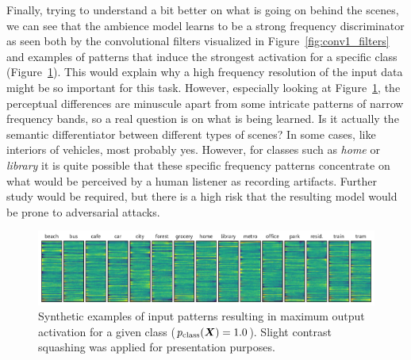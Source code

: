 \documentclass{article}
\newcommand{\symmat}[1]{{\mbox{\boldmath $#1$}}}
\begin{document}
\begin{sloppy}
Finally, trying to understand a bit better on what is going on behind the scenes, we can see that the ambience model learns to be a strong frequency discriminator as seen both by the convolutional filters visualized in Figure~\ref{fig:conv1_filters} and examples of patterns that induce the strongest activation for a specific class (Figure~\ref{fig:max_activations}). This would explain why a high frequency resolution of the input data might be so important for this task. However, especially looking at Figure~\ref{fig:max_activations}, the perceptual differences are minuscule apart from some intricate patterns of narrow frequency bands, so a real question is on what is being learned. Is it actually the semantic differentiator between different types of scenes? In some cases, like interiors of vehicles, most probably yes. However, for classes such as \textit{home} or \textit{library} it is quite possible that these specific frequency patterns concentrate on what would be perceived by a human listener as recording artifacts. Further study would be required, but there is a high risk that the resulting model would be prone to adversarial attacks.

\begin{figure}[t]
  \centering
  \centerline{\includegraphics[width=\columnwidth]{figures/max_activations.pdf}}
  \caption{Synthetic examples of input patterns resulting in maximum output activation for a given class ($p_\textrm{class}(\symmat{X}) = 1.0$). Slight contrast squashing was applied for presentation purposes.}
  \label{fig:max_activations}
  \vspace{-6pt}
\end{figure}


\end{sloppy}
\end{document}
